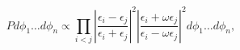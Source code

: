 \begin{equation}
Pd\phi_1 \dots d\phi_n\propto
\prod_{i<j}\left|\frac{\epsilon_i-\epsilon_j}
{\epsilon_i+\epsilon_j}\right|^2\left|\frac{\epsilon_i+\omega\epsilon_j}
{\epsilon_i-\omega\epsilon_j}\right|^2 d\phi_1 \dots d\phi_n,
\label{distribution2}\end{equation}

